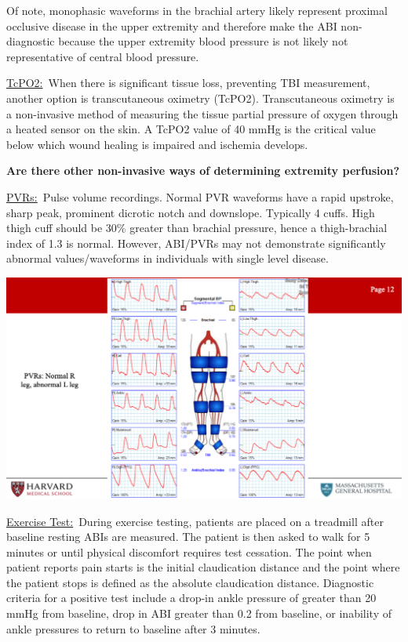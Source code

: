 \documentclass[
]{book}
\begin{document}
Of note, monophasic waveforms in the brachial artery likely represent
proximal occlusive disease in the upper extremity and therefore make the
ABI non-diagnostic because the upper extremity blood pressure is not
likely not representative of central blood pressure.\citep{chen2014}

\uline{TcPO2:}~When there is significant tissue loss, preventing
TBI measurement, another option is transcutaneous oximetry
(TcPO2).\citep{mills2014} Transcutaneous oximetry is a non-invasive method of
measuring the tissue partial pressure of oxygen through a heated sensor
on the skin. A TcPO2 value of 40 mmHg is the critical value below which
wound healing is impaired and ischemia develops.

\textbf{Are there other non-invasive ways of determining extremity
perfusion?}

\uline{PVRs:}~Pulse volume recordings. Normal PVR waveforms have a
rapid upstroke, sharp peak, prominent dicrotic notch and downslope.
Typically 4 cuffs. High thigh cuff should be 30\% greater than brachial
pressure, hence a thigh-brachial index of 1.3 is normal. However,
ABI/PVRs may not demonstrate significantly abnormal values/waveforms in
individuals with single level disease.

\includegraphics[width=15.01in]{images/vasc_lab2/Slide13}

\uline{Exercise Test:}~During exercise testing, patients are
placed on a treadmill after baseline resting ABIs are measured. The
patient is then asked to walk for 5 minutes or until physical discomfort
requires test cessation. The point when patient reports pain starts is
the initial claudication distance and the point where the patient stops
is defined as the absolute claudication distance. Diagnostic criteria
for a positive test include a drop-in ankle pressure of greater than 20
mmHg from baseline, drop in ABI greater than 0.2 from baseline, or
inability of ankle pressures to return to baseline after 3
minutes.\citep{strandness1964}
\end{document}
